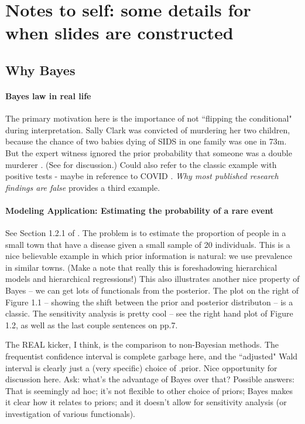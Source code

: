\documentclass{article} %
\begin{document}
\section{Notes to self:  some details for when slides are constructed}

\subsection{Why Bayes}

\paragraph{Bayes law in real life}
The primary motivation here is the importance of not ``flipping the conditional" during interpretation.   Sally Clark was convicted of murdering her two children,  because the chance of two babies dying of SIDS in one family was one in 73m.   But the expert witness ignored the prior probability that someone was a double murderer \cite{guardianXXXXobscure}.  (See \cite{hill2004multiple} for discussion.)      Could also refer to the classic example with positive tests - maybe in reference to COVID \cite{guardianXXXXobscure}.     \textit{Why most published research findings are false} \cite{ioannidis2005most} provides a third example. 

\paragraph{Modeling Application: Estimating the probability of a rare event}
See Section 1.2.1 of \cite{hoff2009first}.  The problem is to estimate the proportion of people in a small town that have a disease given a small sample of 20 individuals.     This is a nice believable example in which prior information is natural: we use prevalence in similar towns.  (Make a note that really this is foreshadowing hierarchical models and hierarchical regressions!)  This also illustrates another nice property of Bayes  -- we can get lots of functionals from the posterior.  The plot on the right of Figure 1.1 -- showing the shift between the prior and posterior distributon -- is a classic.   The sensitivity analysis is pretty cool -- see the right hand plot of Figure 1.2,  as well as the last couple sentences on pp.7.    

The REAL kicker,  I think,  is the comparison to non-Bayesian methods.  The frequentist confidence interval is complete garbage here,  and the ``adjusted" Wald interval is clearly just a (very specific) choice of .prior.   Nice opportunity for discussion here.  Ask:  what's the advantage of Bayes over that?  Possible answers: That is seemingly ad hoc; it's not flexible to other choice of priors; Bayes makes it clear how it relates to priors; and it doesn't allow for sensitivity analysis (or investigation of various functionals).  
\end{document}

